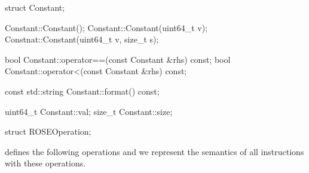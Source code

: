 \begin{apient}
struct Constant;
\end{apient}

\begin{apient}
Constant::Constant();
Constant::Constant(uint64_t v);
Constnat::Constant(uint64_t v, size_t s);
\end{apient}

\begin{apient}
bool Constant::operator==(const Constant &rhs) const;
bool Constant::operator<(const Constant &rhs) const;
\end{apient}

\begin{apient}
const std::string Constant::format() const;
\end{apient}

\begin{apient}
uint64_t Constant::val;
size_t Constant::size;
\end{apient}

\begin{apient}
struct ROSEOperation;
\end{apient}

 defines the following operations and we represent the
semantics of all instructions with these operations.

